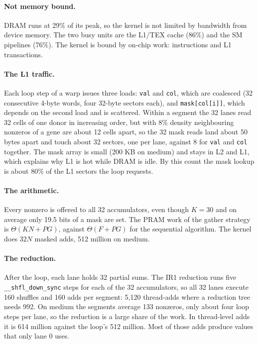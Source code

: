 \documentclass[sigconf,nonacm]{acmart}
\newcommand{\code}[1]{\texttt{#1}}
\begin{document}
\paragraph{Not memory bound.} DRAM runs at 29\% of its peak, so the kernel is not limited by
bandwidth from device memory. The two busy units are the L1/TEX cache (86\%) and the SM pipelines
(76\%). The kernel is bound by on-chip work: instructions and L1 transactions.

\paragraph{The L1 traffic.} Each loop step of a warp issues three loads: \code{val} and \code{col},
which are coalesced (32 consecutive 4-byte words, four 32-byte sectors each), and \code{mask[col[i]]},
which depends on the second load and is scattered. Within a segment the 32 lanes read 32 cells of one
donor in increasing order, but with 8\% density neighbouring nonzeros of a gene are about 12 cells apart,
so the 32 mask reads land about 50 bytes apart and touch about 32 sectors, one per lane, against 8
for \code{val} and \code{col} together. The mask array is small
(200 KB on medium) and stays in L2 and L1, which explains why L1 is hot while DRAM is idle. By this count the mask lookup is about 80\% of the L1 sectors the loop requests.

\paragraph{The arithmetic.} Every nonzero is offered to all 32 accumulators, even though $K = 30$ and
on average only 19.5 bits of a mask are set. The PRAM work of the gather strategy is
$\Theta(KN + PG)$, against $\Theta(F + PG)$ for the sequential algorithm. The kernel does $32N$
masked adds, 512 million on medium.

\paragraph{The reduction.} After the loop, each lane holds 32 partial sums. The IR1 reduction runs five
\code{\_\_shfl\_down\_sync} steps for each of the 32 accumulators, so all 32 lanes execute 160 shuffles
and 160 adds per segment: 5,120 thread-adds where a reduction tree needs 992. On medium the segments
average 133 nonzeros, only about four loop steps per lane, so the reduction is a large share of the
work. In thread-level adds it is 614 million against the loop's 512 million. Most of those adds
produce values that only lane 0 uses.
\end{document}
